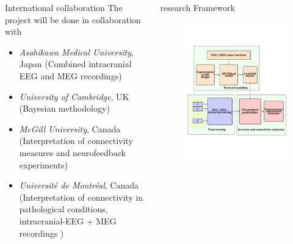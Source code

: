\documentclass[serif,final]{beamer}
\begin{document}
\begin{frame}{}
\begin{columns}[t]
\begin{column}{0.45\linewidth}
	\begin{block}{International collaboration}
        The project will be done in collaboration with 
        \begin{itemize}
    		    \small
        		\item \textit{Asahikawa Medical University}, Japan (Combined intracranial EEG and MEG recordings)
	        \item \textit{University of Cambridge}, UK (Bayesian methodology)
    		    \item \textit{McGill University}, Canada (Interpretation of connectivity measures and neurofeedback experiments)
    		    \item  \textit{Universit\'e de Montr\'eal}, Canada (Interpretation of connectivity in pathological conditions, intracranial-EEG + MEG recordings )
        \end{itemize}      
    \end{block}
    \end{column}%

    \begin{column}{0.5\linewidth}

      \begin{block}{research Framework}     
 	  \begin{figure}
    		    \vspace{2cm}
       		 \centering    
	         \includegraphics[width = 0.4\linewidth]{framework_ver2}
        \end{figure}
       

\end{block}
\end{column}
\end{columns}
\end{frame}
\end{document}
